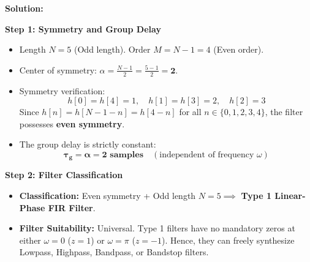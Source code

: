\documentclass[11pt,a4paper]{article}
\begin{document}
\vspace{1mm}
\noindent\textbf{Solution:}

\noindent\textbf{Step 1: Symmetry and Group Delay}
\begin{itemize}
    \item Length $N = 5$ (Odd length). Order $M = N - 1 = 4$ (Even order).
    \item Center of symmetry: $\alpha = \frac{N-1}{2} = \frac{5-1}{2} = \mathbf{2}$.
    \item Symmetry verification:
    \begin{equation}
    h[0] = h[4] = 1, \quad h[1] = h[3] = 2, \quad h[2] = 3
    \end{equation}
    Since $h[n] = h[N-1-n] = h[4-n]$ for all $n \in \{0, 1, 2, 3, 4\}$, the filter possesses \textbf{even symmetry}.
    \item The group delay is strictly constant:
    \begin{equation}
    \mathbf{\tau_g = \alpha = 2 \text{ samples}} \quad (\text{independent of frequency } \omega)
    \end{equation}
\end{itemize}

\vspace{1mm}
\noindent\textbf{Step 2: Filter Classification}
\begin{itemize}
    \item \textbf{Classification:} Even symmetry + Odd length $N = 5 \implies$ \textbf{Type 1 Linear-Phase FIR Filter}.
    \item \textbf{Filter Suitability:} Universal. Type 1 filters have no mandatory zeros at either $\omega = 0$ ($z = 1$) or $\omega = \pi$ ($z = -1$). Hence, they can freely synthesize Lowpass, Highpass, Bandpass, or Bandstop filters.
\end{itemize}
\end{document}

